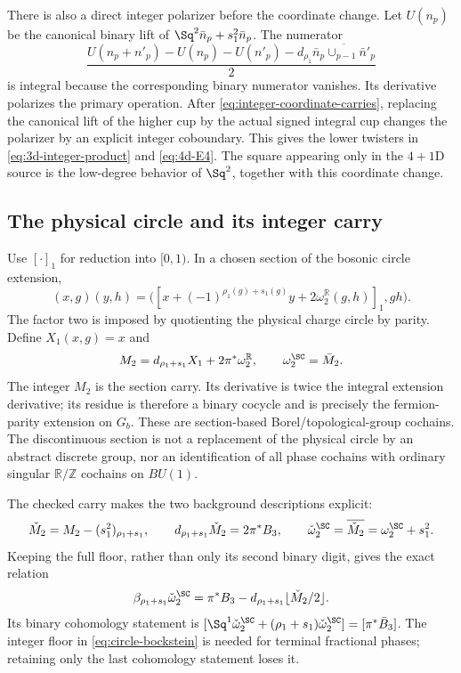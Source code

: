 There is also a direct integer polarizer before the coordinate change. Let $U(n_p)$ be the canonical binary lift of $\Sq^2\bar n_p+s_1^2\bar n_p$. The numerator
\begin{equation}\label{eq:raw-integral-product}
 \frac{U(n_p+n'_p)-U(n_p)-U(n'_p)
      -d_{\rho_1}\overline{\bar n_p\cup_{p-1}\bar n'_p}}2
\end{equation}
is integral because the corresponding binary numerator vanishes. Its derivative polarizes the primary operation. After \eqref{eq:integer-coordinate-carries}, replacing the canonical lift of the higher cup by the actual signed integral cup changes the polarizer by an explicit integer coboundary. This gives the lower twisters in \eqref{eq:3d-integer-product} and \eqref{eq:4d-E4}. The square appearing only in the $4+1$D source is the low-degree behavior of $\Sq^2$, together with this coordinate change.

\subsection{The physical circle and its integer carry}\label{subsec:circle}
Use $[\cdot]_1$ for reduction into $[0,1)$. In a chosen section of the bosonic circle extension,
\begin{equation}\label{eq:circle-law}
 (x,g)(y,h)
 =\big([x+(-1)^{\rho_1(g)+s_1(g)}y
               +2\omega_2^{\mathbb R}(g,h)]_1,gh\big).
\end{equation}
The factor two is imposed by quotienting the physical charge circle by parity. Define $X_1(x,g)=x$ and
\begin{equation}\label{eq:circle-carry}
 M_2=d_{\rho_1+s_1}X_1+2\pi^*\omega_2^{\mathbb R},\qquad
 \omega_2^{\SC}=\bar M_2.
\end{equation}
The integer $M_2$ is the section carry. Its derivative is twice the integral extension derivative; its residue is therefore a binary cocycle and is precisely the fermion-parity extension on $G_b$. These are section-based Borel/topological-group cochains. The discontinuous section is not a replacement of the physical circle by an abstract discrete group, nor an identification of all phase cochains with ordinary singular $\mathbb R/\mathbb Z$ cochains on $BU(1)$.

The checked carry makes the two background descriptions explicit:
\begin{equation}\label{eq:checked-circle-carry}
 \check M_2=M_2-(s_1^2)_{\rho_1+s_1},\qquad
 d_{\rho_1+s_1}\check M_2=2\pi^*B_3,\qquad
 \check\omega_2^{\SC}=\overline{\check M_2}=\omega_2^{\SC}+s_1^2.
\end{equation}
Keeping the full floor, rather than only its second binary digit, gives the exact relation
\begin{equation}\label{eq:circle-bockstein}
 \beta_{\rho_1+s_1}\check\omega_2^{\SC}
 =\pi^*B_3-d_{\rho_1+s_1}\lfloor\check M_2/2\rfloor.
\end{equation}
Its binary cohomology statement is
$[\Sq^1\check\omega_2^{\SC}
 +(\rho_1+s_1)\check\omega_2^{\SC}]=[\pi^*\bar B_3]$.
The integer floor in \eqref{eq:circle-bockstein} is needed for terminal fractional phases; retaining only the last cohomology statement loses it.

